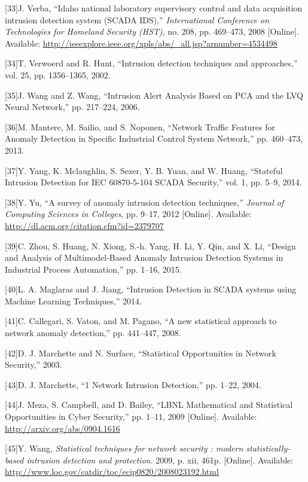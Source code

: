 \documentclass[11pt,]{article}
\begin{document}
{[}33{]}J. Verba, ``Idaho national laboratory supervisory control and
data acquisition intrusion detection system (SCADA IDS),''
\emph{International Conference on Technologies for Homeland Security
(HST)}, no. 208, pp. 469--473, 2008 {[}Online{]}. Available:
\url{http://ieeexplore.ieee.org/xpls/abs/_all.jsp?arnumber=4534498}

{[}34{]}T. Verwoerd and R. Hunt, ``Intrusion detection techniques and
approaches,'' vol. 25, pp. 1356--1365, 2002.

{[}35{]}J. Wang and Z. Wang, ``Intrusion Alert Analysis Based on PCA and
the LVQ Neural Network,'' pp. 217--224, 2006.

{[}36{]}M. Mantere, M. Sailio, and S. Noponen, ``Network Traffic
Features for Anomaly Detection in Specific Industrial Control System
Network,'' pp. 460--473, 2013.

{[}37{]}Y. Yang, K. Mclaughlin, S. Sezer, Y. B. Yuan, and W. Huang,
``Stateful Intrusion Detection for IEC 60870-5-104 SCADA Security,''
vol. 1, pp. 5--9, 2014.

{[}38{]}Y. Yu, ``A survey of anomaly intrusion detection techniques,''
\emph{Journal of Computing Sciences in Colleges}, pp. 9--17, 2012
{[}Online{]}. Available: \url{http://dl.acm.org/citation.cfm?id=2379707}

{[}39{]}C. Zhou, S. Huang, N. Xiong, S.-h. Yang, H. Li, Y. Qin, and X.
Li, ``Design and Analysis of Multimodel-Based Anomaly Intrusion
Detection Systems in Industrial Process Automation,'' pp. 1--16, 2015.

{[}40{]}L. A. Maglaras and J. Jiang, ``Intrusion Detection in SCADA
systems using Machine Learning Techniques,'' 2014.

{[}41{]}C. Callegari, S. Vaton, and M. Pagano, ``A new statistical
approach to network anomaly detection,'' pp. 441--447, 2008.

{[}42{]}D. J. Marchette and N. Surface, ``Statistical Opportunities in
Network Security,'' 2003.

{[}43{]}D. J. Marchette, ``1 Network Intrusion Detection,'' pp. 1--22,
2004.

{[}44{]}J. Meza, S. Campbell, and D. Bailey, ``LBNL Mathematical and
Statistical Opportunities in Cyber Security,'' pp. 1--11, 2009
{[}Online{]}. Available: \url{http://arxiv.org/abs/0904.1616}

{[}45{]}Y. Wang, \emph{Statistical techniques for network security :
modern statistically-based intrusion detection and protection}. 2009, p.
xii, 461p. {[}Online{]}. Available:
\url{http://www.loc.gov/catdir/toc/ecip0820/2008023192.html}
\end{document}
